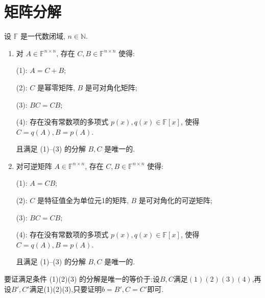 \documentclass[../../main.tex]{subfiles}
\begin{document}
\section{矩阵分解}

\begin{theorem}[Jordan分解]\label{theorem:矩阵分解-Jordan分解}
设 \( \mathbb{F} \) 是一代数闭域, \( n \in \mathbb{N} \).
\begin{enumerate}
\item 对 \( A \in \mathbb{F}^{n \times n} \), 存在 \( C, B \in \mathbb{F}^{n \times n} \) 使得:

(1): \( A = C + B \);

(2): \( C \) 是幂零矩阵, \( B \) 是可对角化矩阵;

(3): \( BC = CB \);

(4): 存在没有常数项的多项式 \( p(x), q(x) \in \mathbb{F}[x] \), 使得 \( C = q(A), B = p(A) \). 

且满足 (1)--(3) 的分解 \( B, C \) 是唯一的.


\item  对可逆矩阵 \( A \in \mathbb{F}^{n \times n} \), 存在 \( C, B \in \mathbb{F}^{n \times n} \) 使得:

(1): \( A = CB \);

(2): \( C \) 是特征值全为单位元1的矩阵, \( B \) 是可对角化的可逆矩阵;

(3): \( BC = CB \);

(4): 存在没有常数项的多项式 \( p(x), q(x) \in \mathbb{F}[x] \), 使得 \( C = q(A), B = p(A) \).

且满足 (1)--(3) 的分解 \( B, C \) 是唯一的.
\end{enumerate}
\end{theorem}
\begin{remark}
要证满足条件 (1)(2)(3) 的分解是唯一的等价于:设$B,C$满足$(1)(2)(3)(4)$,再设$B',C'$满足(1)(2)(3),只要证明$b=B',C=C'$即可.
\end{remark}
\end{document}

